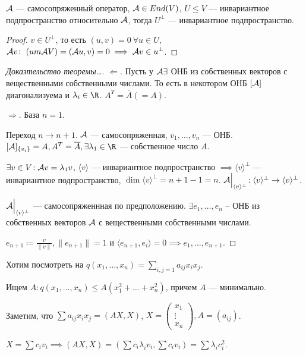 \begin{statement}
    $\mathcal{A}$ --- самосопряженный оператор,  $\mathcal{A} \in End(V)$,  $U \le V$ --- инвариантное подпространство относительно $\mathcal{A}$, тогда  $U^\perp$ --- инвариантное подпространство. 
\end{statement}
\begin{proof}
    $v \in U^\perp$, то есть  $(u, v) = 0\ \forall u \in U$,  $\mathcal{A} v\!:\ (um \mathcal{A} V) = (\mathcal{A} u, v) = 0 \implies \mathcal{A} v \in u^\perp$.
\end{proof}
\begin{proof}[Доказтельство теоремы\dots]
    $\Leftarrow$. Пусть у  $\mathcal{A} \exists$ ОНБ из собственных векторов с вещественными собственными числами. То есть в некотором ОНБ $[\mathcal{A}]$ диагонализуема и  $\lambda_i \in \R$.  $A^T = \overline{A}(= A)$.  

    $\Rightarrow$. База $n=1$.

    Переход  $n \to n+1$.  $\mathcal{A}$ --- самосопряженная,  $v_1, \ldots, v_n$ --- ОНБ. $[\CA]_{\{v_i\}} = A, A^T = \overline{A}, \exists \lambda_1 \in \R$ --- собственное число $A$.

    $\exists v \in V\!: \mathcal{A} v = \lambda_1 v$, $\langle v \rangle$ --- инвариантное подпространство  $\implies \langle v \rangle^\perp$ --- инвариантное подпространство,  $\dim \langle v \rangle^{\perp} = n  + 1 - 1 = n$.  $\mathcal{A} \Big|_{\langle v \rangle^{\perp}}\!: \langle v \rangle^\perp \to \langle v \rangle ^\perp$.

    $\mathcal{A}\Big|_{\langle v \rangle^\perp}$ --- самосопряженнная по предположению.  $\exists e_1, \ldots ,e_n$ -- ОНБ из собственных векторов $\mathcal{A}$ с вещественными собственными числами.

    $e_{n+1} \coloneqq \frac{v}{\|v\|}, \|e_{n+1}\| = 1$ и $\langle e_{n+1}, e_i \rangle = 0 \implies e_1, \ldots, e_{n+1}$. 
\end{proof}

Хотим посмотреть на $q(x_1, \ldots, x_n) = \sum\limits_{i,j=1} a_{ij} x_ix_j$.

Ищем $A\!: q(x_1, \ldots, x_n) \le A(x_1^2 + \ldots + x_n^2)$, причем $A$ --- минимально.

Заметим, что  $\sum a_{ij} x_ix_j = (AX, X)$,  $X = \begin{pmatrix} x_1 \\ \vdots \\ x_n \end{pmatrix}, A = (a_{ij})$.

$X = \sum c_iv_i \implies(AX, X) = (\sum c_i \lambda_i v_i, \sum c_i v_i) = \sum \lambda_i c_i^2$.

